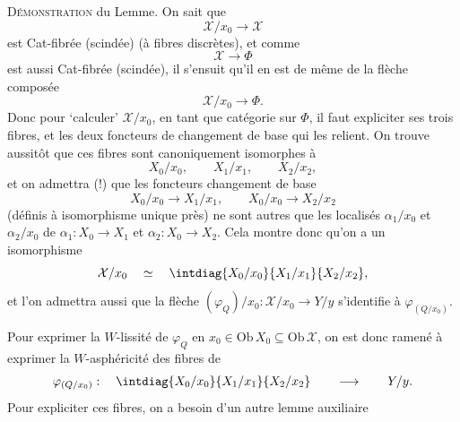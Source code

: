 \noindent\textsc{Démonstration} du Lemme. On sait que
\[
\mathcal{X}/x_0\longrightarrow\mathcal{X}
\]
est Cat-fibrée (scindée) (à fibres discrètes), et comme
\[
\mathcal{X}\longrightarrow\Phi
\]
est aussi Cat-fibrée (scindée), il s'ensuit qu'il en est de même de la flèche composée
\[
\mathcal{X}/x_0\longrightarrow\Phi.
\]
Donc pour `calculer' $\mathcal{X}/x_0$, en tant que catégorie sur $\Phi$, il faut expliciter ses trois fibres, et les deux foncteurs de changement de base qui les relient. On trouve aussitôt que ces fibres sont canoniquement isomorphes à
\[
X_0/x_0, \qquad X_1/x_1, \qquad X_2/x_2,
\]
et on admettra (!) que les foncteurs changement de base
\[
X_0/x_0\longrightarrow X_1/x_1, \qquad X_0/x_0\longrightarrow X_2/x_2
\]
(définis à isomorphisme unique près) ne sont autres que les localisés $\alpha_1/x_0$ et $\alpha_2/x_0$ de $\alpha_1 : X_0\longrightarrow X_1$ et $\alpha_2 : X_0\longrightarrow X_2$. Cela montre donc qu'on a un isomorphisme
\[
\mathcal{X}/x_0 \quad\simeq\quad \intdiag{X_0/x_0}{X_1/x_1}{X_2/x_2} ,
\]
et l'on admettra aussi que la flèche $(\varphi_Q)/x_0 : \mathcal{X}/x_0\longrightarrow Y/y$ s'identifie à $\varphi_{(Q/x_0)}$.

Pour exprimer la $W$-lissité de $\varphi_Q$ en $x_0\in\mathrm{Ob}\,X_0\subseteq\mathrm{Ob}\,\mathcal{X}$, on est donc ramené à exprimer la $W$-asphéricité des fibres de
\[
\varphi_{(Q/x_0)} : \quad \intdiag{X_0/x_0}{X_1/x_1}{X_2/x_2} \qquad\longrightarrow\qquad Y/y.
\]
Pour expliciter ces fibres, on a besoin d'un autre lemme auxiliaire

